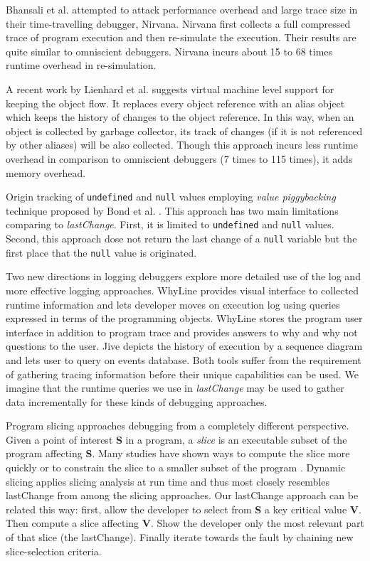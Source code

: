 \documentclass{sig-alternate}
\begin{document}
Bhansali et al. \cite{Bhansali} attempted to attack performance overhead 
and large trace size in their time-travelling debugger, Nirvana. Nirvana 
first collects a full compressed trace of program execution and then 
re-simulate the execution. Their results are quite similar to omniscient 
debuggers. Nirvana incurs about 15 to 68 times runtime overhead in 
re-simulation.

A recent work by Lienhard et al.\cite{Lienhard} suggests virtual
machine level support for keeping the object flow. It replaces every
object reference with an alias object which keeps the history of
changes to the object reference. In this way, when an object is
collected by garbage collector, its track of changes (if it is not
referenced by other aliases) will be also collected. Though this
approach incurs less runtime overhead in
comparison to omniscient debuggers (7 times to 115 times), it adds memory
overhead. 

Origin tracking of \texttt{undefined} and \texttt{null} values employing \textit{value piggybacking} technique proposed by
Bond et al. \cite{Bond}. This approach has two main limitations comparing to \textit{lastChange}.
First, it is limited to \texttt{undefined} and \texttt{null} values. Second, this approach dose not return the last change
of a \texttt{null} variable but the first place that the \texttt{null} value is originated.

Two new directions in logging debuggers explore more detailed use of
the log and more effective logging approaches. WhyLine\cite{Ko}
provides visual interface to collected runtime information and lets
developer moves on execution log using queries expressed in terms of
the programming objects. WhyLine stores the program user interface in
addition to program trace and provides answers to why and why not
questions to the user. Jive\cite{Czyz} depicts the history of
execution by a sequence diagram and lets user to query on events
database. Both tools suffer from the requirement of gathering tracing information before their unique capabilities can be used.
We imagine that the runtime queries we use in \textit{lastChange}  may be used to gather data incrementally for these kinds of debugging approaches.

Program slicing\cite{Weiser} approaches debugging from a completely different perspective. Given a point of interest {\bf S} in a program, a \textit{slice} is an executable subset of the program affecting {\bf S}.  Many studies have shown ways to compute the slice more quickly or to constrain the slice to a smaller subset of the program \cite{Horwitz, Sridharan}.  Dynamic slicing \cite{Korel} applies slicing analysis at run time and thus most closely resembles lastChange from among the slicing approaches.  Our lastChange approach can be related this way: first, allow the developer to select from {\bf S} a key critical value {\bf V}. Then compute a slice affecting {\bf V}. Show the developer only the most relevant part of that slice (the lastChange). Finally iterate towards the fault by chaining new slice-selection criteria.
\end{document}
